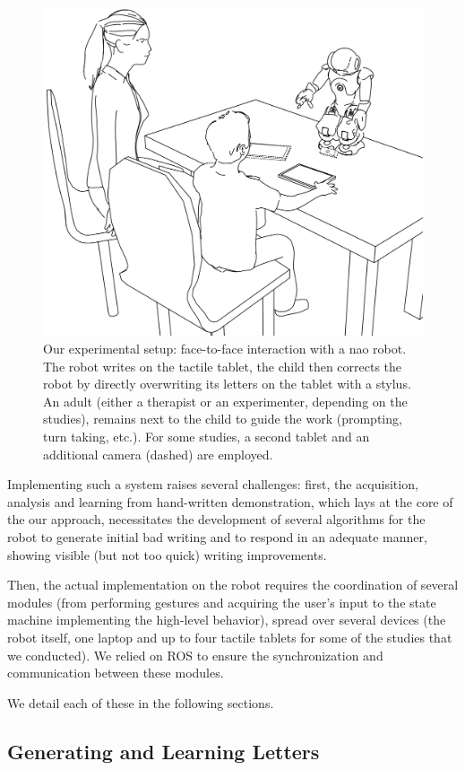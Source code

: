 \documentclass{article}
\begin{document}
\begin{figure}
    \centering
    \includegraphics[width=0.6\columnwidth]{experimental_setup}
    \caption{\small Our experimental setup: face-to-face interaction with a {\sc
        nao} robot.  The robot writes on the tactile tablet, the child then
        corrects the robot by directly overwriting its letters on the tablet
        with a stylus. An adult (either a therapist or an experimenter,
        depending on the studies), remains next to the child to guide the work
        (prompting, turn taking, etc.). For some studies, a second tablet and an
        additional camera (dashed) are employed.}

    \label{experimental_setup}
\end{figure}

Implementing such a system raises several challenges: first, the acquisition,
analysis and learning from hand-written demonstration, which lays at the core of
the our approach, necessitates the development of several algorithms for the
robot to generate initial bad writing and to respond in an adequate manner,
showing visible (but not too quick) writing improvements.

Then, the actual implementation on the robot requires the coordination of
several modules (from performing gestures and acquiring the user's input to the
state machine implementing the high-level behavior), spread over several
devices (the robot itself, one laptop and up to four tactile tablets for some of
the studies that we conducted). We relied on ROS to ensure the synchronization
and communication between these modules.

We detail each of these in the following sections.

\subsection{Generating and Learning Letters}
\end{document}
